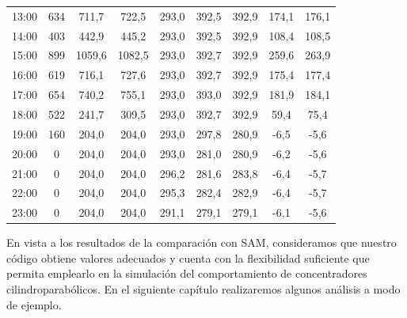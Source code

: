 \begin{table}[H]
{\begin{tabular}{ccccccccc}
13:00 & 634 & 711,7  & 722,5  & 293,0 & 392,5 & 392,9 & 174,1 & 176,1 \\
14:00 & 403 & 442,9  & 445,2  & 293,0 & 392,5 & 392,9 & 108,4 & 108,5 \\
15:00 & 899 & 1059,6 & 1082,5 & 293,0 & 392,7 & 392,9 & 259,6 & 263,9 \\
16:00 & 619 & 716,1  & 727,6  & 293,0 & 392,7 & 392,9 & 175,4 & 177,4 \\
17:00 & 654 & 740,2  & 755,1  & 293,0 & 393,0 & 392,9 & 181,9 & 184,1 \\
18:00 & 522 & 241,7  & 309,5  & 293,0 & 392,7 & 392,9 & 59,4  & 75,4  \\
19:00 & 160 & 204,0  & 204,0  & 293,0 & 297,8 & 280,9 & -6,5  & -5,6  \\
20:00 & 0   & 204,0  & 204,0  & 293,0 & 281,0 & 280,9 & -6,2  & -5,6  \\
21:00 & 0   & 204,0  & 204,0  & 296,2 & 281,6 & 283,8 & -6,4  & -5,7  \\
22:00 & 0   & 204,0  & 204,0  & 295,3 & 282,4 & 282,9 & -6,4  & -5,7  \\
23:00 & 0   & 204,0  & 204,0  & 291,1 & 279,1 & 279,1 & -6,1  & -5,6 
\end{tabular}%
}
\end{table}

En vista a los resultados de la comparación con SAM, consideramos que nuestro código obtiene valores adecuados y cuenta con la flexibilidad suficiente que permita emplearlo en la simulación del comportamiento de concentradores cilindroparabólicos. En el siguiente capítulo realizaremos algunos análisis a modo de ejemplo.


